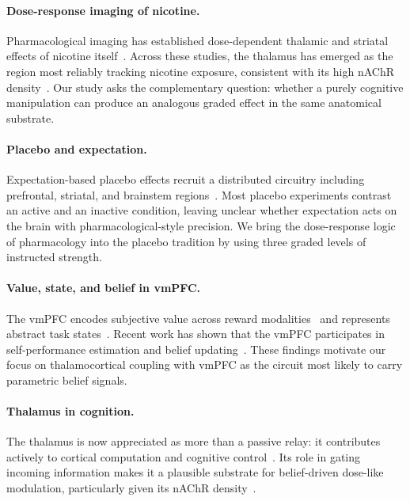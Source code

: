 \documentclass[11pt]{article}
\begin{document}
\paragraph{Dose-response imaging of nicotine.} Pharmacological imaging has established dose-dependent thalamic and striatal effects of nicotine itself~\cite{brody2006cigarette,brody2011ventral,cosgrove2009beta2}. Across these studies, the thalamus has emerged as the region most reliably tracking nicotine exposure, consistent with its high nAChR density~\cite{picciotto2008nicotinic}. Our study asks the complementary question: whether a purely cognitive manipulation can produce an analogous graded effect in the same anatomical substrate.

\paragraph{Placebo and expectation.} Expectation-based placebo effects recruit a distributed circuitry including prefrontal, striatal, and brainstem regions~\cite{wager2004placebo,benedetti2013placebo}. Most placebo experiments contrast an active and an inactive condition, leaving unclear whether expectation acts on the brain with pharmacological-style precision. We bring the dose-response logic of pharmacology into the placebo tradition by using three graded levels of instructed strength.

\paragraph{Value, state, and belief in vmPFC.} The vmPFC encodes subjective value across reward modalities~\cite{plassmann2007orbitofrontal,levy2012root} and represents abstract task states~\cite{wilson2014orbitofrontal,schuck2016human}. Recent work has shown that the vmPFC participates in self-performance estimation and belief updating~\cite{rouault2018belief,rouault2022prefrontal}. These findings motivate our focus on thalamocortical coupling with vmPFC as the circuit most likely to carry parametric belief signals.

\paragraph{Thalamus in cognition.} The thalamus is now appreciated as more than a passive relay: it contributes actively to cortical computation and cognitive control~\cite{sherman2016thalamus,halassa2017thalamic}. Its role in gating incoming information makes it a plausible substrate for belief-driven dose-like modulation, particularly given its nAChR density~\cite{picciotto2008nicotinic}.
\end{document}
